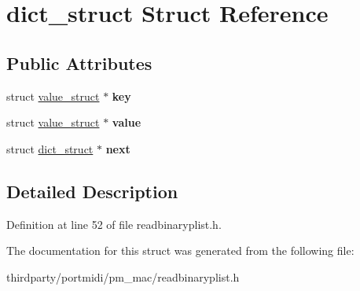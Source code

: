 \hypertarget{structdict__struct}{}\section{dict\+\_\+struct Struct Reference}
\label{structdict__struct}
\subsection*{Public Attributes}
\begin{DoxyCompactItemize}
\item 
\mbox{\label{structdict__struct_a906ac1c2d1ef832872d21a370fd889b2}} 
struct \hyperlink{structvalue__struct}{value\+\_\+struct} $\ast$ {\bfseries key}
\item 
\mbox{\label{structdict__struct_a8f0a429176b1c1a0eabb9e1e73d228a1}} 
struct \hyperlink{structvalue__struct}{value\+\_\+struct} $\ast$ {\bfseries value}
\item 
\mbox{\label{structdict__struct_adc33b2f20c741e3cde74fbdda543f69b}} 
struct \hyperlink{structdict__struct}{dict\+\_\+struct} $\ast$ {\bfseries next}
\end{DoxyCompactItemize}


\subsection{Detailed Description}


Definition at line 52 of file readbinaryplist.\+h.



The documentation for this struct was generated from the following file\+:\begin{DoxyCompactItemize}
\item 
thirdparty/portmidi/pm\+\_\+mac/readbinaryplist.\+h\end{DoxyCompactItemize}
